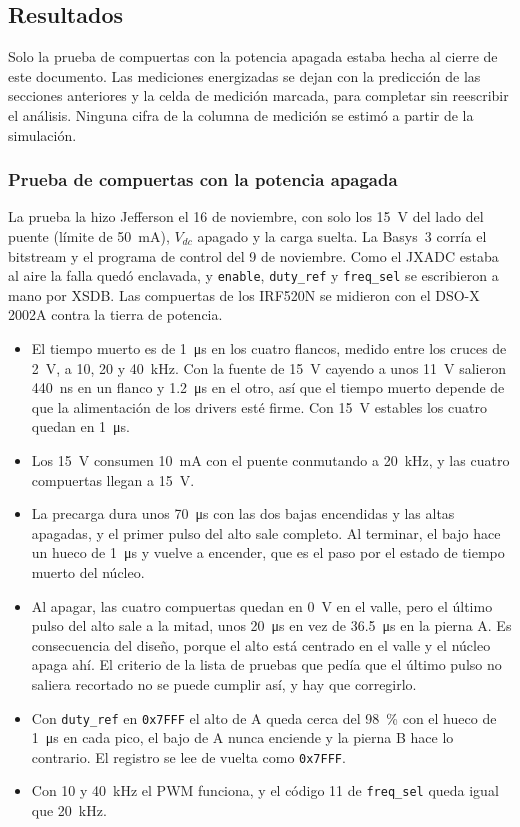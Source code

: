 \documentclass[journal]{IEEEtran}
\begin{document}
\subsection{Resultados}
\label{sec:res}
Solo la prueba de compuertas con la potencia apagada estaba hecha al cierre de este documento. Las mediciones energizadas se dejan con la predicción de las secciones anteriores y la celda de medición marcada, para completar sin reescribir el análisis. Ninguna cifra de la columna de medición se estimó a partir de la simulación.

\subsubsection{Prueba de compuertas con la potencia apagada}
\label{sec:res_compuertas}
La prueba la hizo Jefferson el 16 de noviembre, con solo los \SI{15}{V} del lado del puente (límite de \SI{50}{mA}), $V_{dc}$ apagado y la carga suelta. La Basys~3 corría el bitstream y el programa de control del 9 de noviembre. Como el JXADC estaba al aire la falla quedó enclavada, y \texttt{enable}, \texttt{duty\_ref} y \texttt{freq\_sel} se escribieron a mano por XSDB. Las compuertas de los IRF520N se midieron con el DSO-X 2002A contra la tierra de potencia.

\begin{itemize}
	\item El tiempo muerto es de \SI{1}{\micro s} en los cuatro flancos, medido entre los cruces de \SI{2}{V}, a \num{10}, \num{20} y \SI{40}{kHz}. Con la fuente de \SI{15}{V} cayendo a unos \SI{11}{V} salieron \SI{440}{ns} en un flanco y \SI{1.2}{\micro s} en el otro, así que el tiempo muerto depende de que la alimentación de los drivers esté firme. Con \SI{15}{V} estables los cuatro quedan en \SI{1}{\micro s}.
	\item Los \SI{15}{V} consumen \SI{10}{mA} con el puente conmutando a \SI{20}{kHz}, y las cuatro compuertas llegan a \SI{15}{V}.
	\item La precarga dura unos \SI{70}{\micro s} con las dos bajas encendidas y las altas apagadas, y el primer pulso del alto sale completo. Al terminar, el bajo hace un hueco de \SI{1}{\micro s} y vuelve a encender, que es el paso por el estado de tiempo muerto del núcleo.
	\item Al apagar, las cuatro compuertas quedan en \SI{0}{V} en el valle, pero el último pulso del alto sale a la mitad, unos \SI{20}{\micro s} en vez de \SI{36.5}{\micro s} en la pierna A. Es consecuencia del diseño, porque el alto está centrado en el valle y el núcleo apaga ahí. El criterio de la lista de pruebas que pedía que el último pulso no saliera recortado no se puede cumplir así, y hay que corregirlo.
	\item Con \texttt{duty\_ref} en \texttt{0x7FFF} el alto de A queda cerca del \SI{98}{\percent} con el hueco de \SI{1}{\micro s} en cada pico, el bajo de A nunca enciende y la pierna B hace lo contrario. El registro se lee de vuelta como \texttt{0x7FFF}.
	\item Con \num{10} y \SI{40}{kHz} el PWM funciona, y el código \num{11} de \texttt{freq\_sel} queda igual que \SI{20}{kHz}.
\end{itemize}
\end{document}

